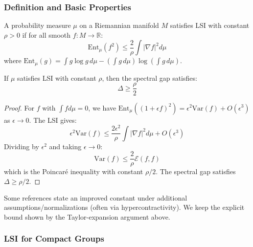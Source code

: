 \subsubsection{Definition and Basic Properties}

\begin{definition}
A probability measure $\mu$ on a Riemannian manifold $M$ satisfies LSI with constant $\rho > 0$ if for all smooth $f: M \to \mathbb{R}$:
\begin{equation}
    \text{Ent}_\mu(f^2) \leq \frac{2}{\rho} \int |\nabla f|^2 d\mu
\end{equation}
where $\text{Ent}_\mu(g) = \int g \log g \, d\mu - (\int g \, d\mu) \log(\int g \, d\mu)$.
\end{definition}

\begin{theorem}\label{thm:lsi-gap}
If $\mu$ satisfies LSI with constant $\rho$, then the spectral gap satisfies:
\begin{equation}
    \Delta \geq \frac{\rho}{2}
\end{equation}
\end{theorem}

\begin{proof}
For $f$ with $\int f d\mu = 0$, we have $\text{Ent}_\mu((1+\epsilon f)^2) = \epsilon^2 \text{Var}(f) + O(\epsilon^3)$ as $\epsilon \to 0$. The LSI gives:
\begin{equation}
    \epsilon^2 \text{Var}(f) \leq \frac{2\epsilon^2}{\rho} \int |\nabla f|^2 d\mu + O(\epsilon^3)
\end{equation}
Dividing by $\epsilon^2$ and taking $\epsilon \to 0$:
\begin{equation}
    \text{Var}(f) \leq \frac{2}{\rho} \mathcal{E}(f, f)
\end{equation}
which is the Poincar\'e inequality with constant $\rho/2$. The spectral gap satisfies $\Delta \geq \rho/2$.
\end{proof}

\begin{remark}
Some references state an improved constant under additional assumptions/normalizations (often via hypercontractivity). We keep the explicit bound shown by the Taylor-expansion argument above.
\end{remark}

\subsubsection{LSI for Compact Groups}

